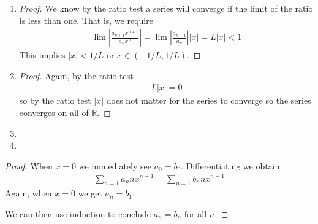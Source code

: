 \begin{enumerate}[label=(\alph*)]
    \item 
    \begin{proof}
        We know by the ratio test a series will converge if the limit of the ratio 
        is less than one. That is, we require 
        \begin{align*}
            \lim |\frac{a_{n+1}x^{n+1}}{a_nx^n}| = \lim |\frac{a_{n+1}}{a_n}||x| = L|x| < 1
        \end{align*}
        This implies $|x|<1/L$ or $x \in (-1/L,1/L)$. 
    \end{proof}

    \item
    \begin{proof}
        Again, by the ratio test
        \begin{align*}
            L|x| = 0
        \end{align*}
        so by the ratio test $|x|$ does not matter for the series to converge so the series 
        converges on all of $\mathbb{R}$.
    \end{proof}

    \item
    
    
    \item

\end{enumerate}

\begin{proof}
    When $x=0$ we immediately see $a_0 = b_0$. Differentiating we obtain
    \begin{align*}
        \sum_{n=1} a_n n x^{n-1} = \sum_{n=1} b_n n x^{n-1}
    \end{align*}
    Again, when $x=0$ we get $a_n=b_1$.

    We can then use induction to conclude $a_n=b_n$ for all $n$.
\end{proof}



